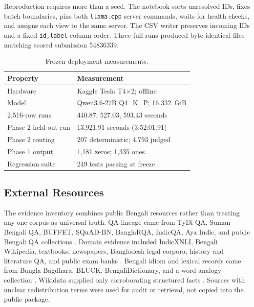 \documentclass[11pt]{article}
\newcommand{\code}[1]{\texttt{#1}}
\begin{document}
Reproduction requires more than a seed. The notebook sorts unresolved IDs, fixes batch boundaries, pins both \texttt{llama.cpp} server commands, waits for health checks, and assigns each view to the same server. The CSV writer preserves incoming IDs and a fixed \code{id,label} column order. Three full runs produced byte-identical files matching scored submission 54836339.

\begin{table}[t]
\caption{Frozen deployment measurements.}
\label{tab:runtime}
\centering
\small
\begin{tabularx}{\columnwidth}{@{}p{}X@{}}
\toprule
Property & Measurement \\
\midrule
Hardware & Kaggle Tesla T4$\times$2; offline \\
Model & Qwen3.6-27B Q4\_K\_P; 16.332~GiB \\
2,516-row runs & 440.87, 527.03, 593.43 seconds \\
Phase 2 held-out run & 13,921.91 seconds (3:52:01.91) \\
Phase 2 routing & 207 deterministic; 4,793 judged \\
Phase 1 output & 1,181 zeros; 1,335 ones \\
Regression suite & 249 tests passing at freeze \\
\bottomrule
\end{tabularx}
\end{table}

\subsection{External Resources}

The evidence inventory combines public Bengali resources rather than treating any one corpus as universal truth. QA lineage came from TyDi QA, Suman Bengali QA, BUFFET, SQuAD-BN, BanglaRQA, IndicQA, Aya Indic, and public Bengali QA collections \citep{tydi,sumanqa,buffet,squadbn,banglarqa,indicqa,ayaindic,qa70k}. Domain evidence included IndicXNLI, Bengali Wikipedia, textbooks, newspapers, Bangladesh legal corpora, history and literature QA, and public exam banks \citep{indicxnli,bnwiki,banglatextbook,banglanews,legalacts,lawqna,preindependence,bonolota,literatureqa,banglammlu,bcsqs,bcs1040}. Bengali idiom and lexical records came from Bangla Bagdhara, BLUCK, BengaliDictionary, and a word-analogy collection \citep{bagdhara,bluck,bengalidict,wordanalogy}. Wikidata supplied only corroborating structured facts \citep{wikidata}. Sources with unclear redistribution terms were used for audit or retrieval, not copied into the public package.
\end{document}
